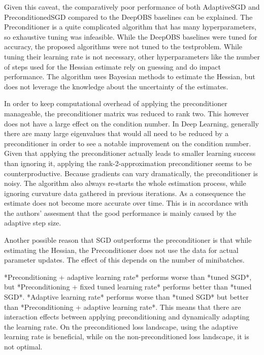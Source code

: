 \documentclass[twoside,12pt,a4paper]{report}
\begin{document}
Given this caveat, the comparatively poor performance of both AdaptiveSGD and PreconditionedSGD compared to the DeepOBS baselines can be explained. The Preconditioner is a quite complicated algorithm that has many hyperparameters, so exhaustive tuning was infeasible. While the DeepOBS baselines were tuned for accuracy, the proposed algorithms were not tuned to the testproblem. While tuning their learning rate is not necessary, other hyperparameters like the number of steps used for the Hessian estimate rely on guessing and do impact performance. The algorithm uses Bayesian methods to estimate the Hessian, but does not leverage the knowledge about the uncertainty of the estimates.

In order to keep computational overhead of applying the preconditioner manageable, the preconditioner matrix was reduced to rank two. This however does not have a large effect on the condition number. In Deep Learning, generally there are many large eigenvalues that would all need to be reduced by a preconditioner in order to see a notable improvement on the condition number. Given that applying the preconditioner actually leads to smaller learning success than ignoring it, applying the rank-2-approximation preconditioner seems to be counterproductive. Because gradients can vary dramatically, the preconditioner is noisy. The algorithm also always re-starts the whole estimation process, while ignoring curvature data gathered in previous iterations. As a consequence the estimate does not become more accurate over time. This is in accordance with the authors' assesment that the good performance is mainly caused by the adaptive step size.

Another possible reason that SGD outperforms the preconditioner is that while estimating the Hessian, the Preconditioner does not use the data for actual parameter updates. The effect of this depends on the number of minibatches.

\begin{markdown}
*Preconditioning + adaptive learning rate* performs worse than *tuned SGD*, but *Preconditioning + fixed tuned learning rate* performs better than *tuned SGD*. *Adaptive learning rate* performs worse than *tuned SGD* but better than *Preconditioning + adaptive learning rate*. This means that there are interaction effects between applying preconditioning and dynamically adapting the learning rate. On the preconditioned loss landscape, using the adaptive learning rate is beneficial, while on the non-preconditioned loss landscape, it is not optimal.
\end{markdown}
\end{document}
